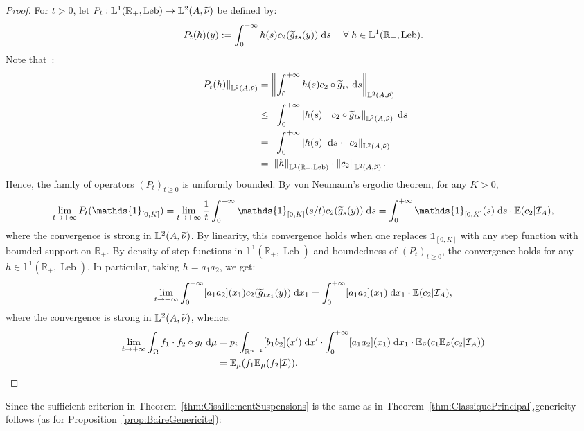 \documentclass[10pt]{amsart}
\theoremstyle{definition}\newtheorem{defi}[theo]{Definition}\newtheorem{rema}[theo]{Remark}\newtheorem{exam}[theo]{Example}\newtheorem{exem}[theo]{Example}\newtheorem{nota}[theo]{Notation}
\DeclareMathOperator{\Leb}{Leb}
\newcommand{\R}{\mathbb{R}}
\newcommand{\Ebb}{\mathbb{E}}
\newcommand{\Lbb}{\mathbb{L}}
\newcommand{\Ical}{\mathcal{I}}
\newcommand{\dd}{\;{\rm d}}
\newcommand{\norm}[2]{\left\| #1 \right\|_{#2}}
\newcommand*{\un}{\mathds{1}}
\let\oldtilde\tilde
\renewcommand*{\tilde}[1]{\mathchoice{\widetilde{#1}}{\widetilde{#1}}{\oldtilde{#1}}{\oldtilde{#1}}}\let\oldhat\hat
\renewcommand*{\hat}[1]{\mathchoice{\widehat{#1}}{\widehat{#1}}{\oldhat{#1}}{\oldhat{#1}}}\let\oldforall\forall
\renewcommand*{\forall}{\mathrel{\oldforall}}
\begin{document}
\begin{proof}
For $t>0$, let $P_t: \Lbb^1 (\R_+, \Leb) \to \Lbb^2 (A, \tilde{\nu})$ be defined by:
\[
P_t (h) (y) := \int_0^{+\infty} h (s) c_2 (\tilde{g}_{ts} (y)) \dd s \quad \forall h \in \Lbb^1 (\R_+, \Leb).
\]
Note that~:
\begin{align*}
\norm{P_t (h)}{\Lbb^2 (A, \tilde{\nu})} & = \norm{\int_0^{+\infty} h (s) c_2 \circ \tilde{g}_{ts} \dd s}{\Lbb^2 (A, \tilde{\nu})} \\
& \leq \;\;\int_0^{+\infty} |h (s)| \norm{c_2 \circ \tilde{g}_{ts}}{\Lbb^2 (A, \tilde{\nu})} \dd s \\
& = \;\;\int_0^{+\infty} |h (s)| \dd s \cdot \norm{c_2}{\Lbb^2 (A, \tilde{\nu})} \\
& = \;\norm{h}{\Lbb^1 (\R_+, \Leb)} \cdot \norm{c_2}{\Lbb^2 (A, \tilde{\nu})}.
\end{align*}
Hence, the family of operators $(P_t)_{t\geq 0}$ is uniformly bounded. By von Neumann's ergodic theorem, for any $K>0$,
\[
\lim_{t \to + \infty} P_t (\un_{[0,K]}) = \lim_{t \to + \infty} \frac{1}{t} \int_0^{+\infty} \un_{[0,K]} (s/t) c_2 (\tilde{g}_s (y)) \dd s = \int_0^{+\infty} \un_{[0,K]} (s) \dd s \cdot \Ebb (c_2 | \Ical_A),
\]
where the convergence is strong in $\Lbb^2 (A, \tilde{\nu})$. By linearity, this convergence holds when one replaces $\un_{[0,K]}$ with any step function with bounded support on $\R_+$. By density of step functions in $\Lbb^1 (\R_+, \Leb)$ and boundedness of $(P_t)_{t \geq 0}$, the convergence holds for any $h \in \Lbb^1 (\R_+, \Leb)$. In particular, taking $h = a_1 a_2$, we get:
\[
\lim_{t \to + \infty} \int_0^{+\infty} [a_1 a_2] (x_1) c_2 (\tilde{g}_{t x_1} (y)) \dd x_1 = \int_0^{+\infty} [a_1 a_2] (x_1) \dd x_1 \cdot \Ebb (c_2 | \Ical_A),
\]
where the convergence is strong in $\Lbb^2 (A, \tilde{\nu})$, whence:
\begin{align*}
\lim_{t \to + \infty} \int_\Omega f_1 \cdot f_2 \circ g_t \dd \mu & = p_i \int_{\R^{n-1}} [b_1 b_2] (x') \dd x' \cdot \int_0^{+\infty} [a_1 a_2] (x_1) \dd x_1 \cdot \Ebb_{\tilde{\nu}} (c_1 \Ebb_{\tilde{\nu}} (c_2 | \Ical_A)) \\
& = \Ebb_\mu (f_1 \Ebb_\mu (f_2 | \Ical)).\qedhere
\end{align*}
\end{proof}


Since the sufficient criterion in Theorem~\ref{thm:CisaillementSuspensions} is the same as in Theorem~\ref{thm:ClassiquePrincipal},\linebreak genericity follows (as for Proposition~\ref{prop:BaireGenericite}):
\end{document}

